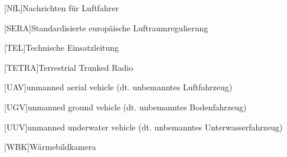 \begin{acronym}[EuGH]
[NfL]{Nachrichten für Luftfahrer}

[SERA]{Standardisierte europäische Luftraumregulierung}

[TEL]{Technische Einsatzleitung}

[TETRA]{Terrestrial Trunked Radio}

[UAV]{unmanned aerial vehicle (dt. unbemanntes Luftfahrzeug)}

[UGV]{unmanned ground vehicle (dt. unbemanntes Bodenfahrzeug)}

[UUV]{unmanned underwater vehicle (dt. unbemanntes Unterwasserfahrzeug)}

[WBK]{Wärmebildkamera}

\end{acronym}